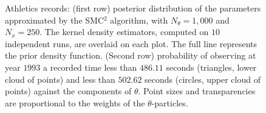 \documentclass{statsoc}
\newcommand{\SMCSQ}{SMC$^2$\xspace}
\begin{document}
\begin{figure}
 \centering
 \caption{\label{fig:athletics:perparameter} Athletics records: (first
row) posterior distribution of the
parameters approximated by the \SMCSQ algorithm, with $N_\theta =1,000$ and
$N_x = 250$. The kernel density
estimators, computed on $10$ independent runs, are overlaid on each plot. The
full
line represents the prior density function. (Second row) probability of
observing at year $1993$ a recorded time less than $486.11$ seconds (triangles,
lower cloud of points) and
less than $502.62$ seconds (circles, upper cloud of points) against the
components of $\theta$. Point sizes
and transparencies are proportional to the weights of the $\theta$-particles.}
\end{figure}



 
\end{document}
